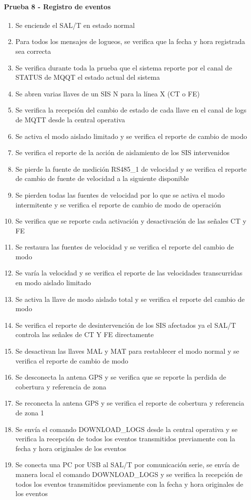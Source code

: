 \paragraph{Prueba 8 - Registro de eventos}
\begin{enumerate}
\item	Se enciende el SAL/T en estado normal
\item	Para todos los mensajes de logueos, se verifica que la fecha y hora registrada sea correcta
\item	Se verifica durante toda la prueba que el sistema reporte por el canal de STATUS de MQQT el estado actual del sistema
\item	Se abren varias llaves de un SIS N para la línea X (CT o FE)
\item	Se verifica la recepción del cambio de estado de cada llave en el canal de logs de MQTT desde la central operativa
\item	Se activa el modo aislado limitado y se verifica el reporte de cambio de modo
\item	Se verifica el reporte de la acción de aislamiento de los SIS intervenidos
\item	Se pierde la fuente de medición RS485\_1 de velocidad y se verifica el reporte de cambio de fuente de velocidad a la siguiente disponible
\item	Se pierden todas las fuentes de velocidad por lo que se activa el modo intermitente y se verifica el reporte de cambio de modo de operación
\item	Se verifica que se reporte cada activación y desactivación de las señales CT y FE
\item	Se restaura las fuentes de velocidad y se verifica el reporte del cambio de modo
\item	Se varía la velocidad y se verifica el reporte de las velocidades transcurridas en modo aislado limitado
\item	Se activa la llave de modo aislado total y se verifica el reporte del cambio de modo
\item	Se verifica el reporte de desintervención de los SIS afectados ya el SAL/T controla las señales de CT Y FE directamente
\item	Se desactivan las llaves MAL y MAT para restablecer el modo normal y se verifica el reporte de cambio de modo
\item	Se desconecta la antena GPS y se verifica que se reporte la perdida de cobertura y referencia de zona
\item	Se reconecta la antena GPS y se verifica el reporte de cobertura y referencia de zona 1
\item	Se envía el comando DOWNLOAD\_LOGS desde la central operativa y se verifica la recepción de todos los eventos transmitidos previamente con la fecha y hora originales de los eventos
\item	Se conecta una PC por USB al SAL/T por comunicación serie, se envía de manera local el comando DOWNLOAD\_LOGS y se verifica la recepción de todos los eventos transmitidos previamente con la fecha y hora originales de los eventos

\end{enumerate}


